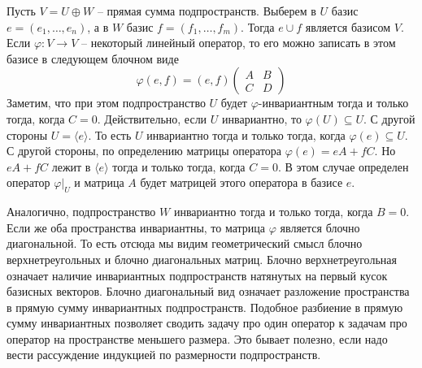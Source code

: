 
Пусть $V = U \oplus W$ -- прямая сумма подпространств.
Выберем в $U$ базис $e=(e_1,\ldots,e_n)$, а в $W$ базис $f = (f_1,\ldots,f_m)$.
Тогда $e \cup f$ является базисом $V$.
Если $\varphi \colon V \to V$ -- некоторый линейный оператор, то его можно записать в этом базисе в следующем блочном виде
\[
\varphi (e, f) = (e, f)
\begin{pmatrix}
{A}&{B}\\
{C}&{D}
\end{pmatrix}
\]
Заметим, что при этом подпространство $U$ будет $\varphi$-инвариантным тогда и только тогда, когда $C = 0$.
Действительно, если $U$ инвариантно, то $\varphi(U)\subseteq U$.
С другой стороны $U = \langle e \rangle$.
То есть $U$ инвариантно тогда и только тогда, когда $\varphi(e) \subseteq U$.
С другой стороны, по определению матрицы оператора $\varphi (e) = eA + fC$.
Но $eA + fC$ лежит в $\langle e\rangle$ тогда и только тогда, когда $C = 0$.
В этом случае определен оператор $\varphi|_U$ и матрица $A$ будет матрицей этого оператора в базисе $e$.

Аналогично, подпространство $W$ инвариантно тогда и только тогда, когда $B = 0$.
Если же оба пространства инвариантны, то матрица $\varphi$ является блочно диагональной.
То есть отсюда мы видим геометрический смысл блочно верхнетреугольных и блочно диагональных матриц.
Блочно верхнетреугольная означает наличие инвариантных подпространств натянутых на первый кусок базисных векторов.
Блочно диагональный вид означает разложение пространства в прямую сумму инвариантных подпространств.
Подобное разбиение в прямую сумму инвариантных позволяет сводить задачу про один оператор к задачам про оператор на пространстве меньшего размера.
Это бывает полезно, если надо вести рассуждение индукцией по размерности подпространств.


